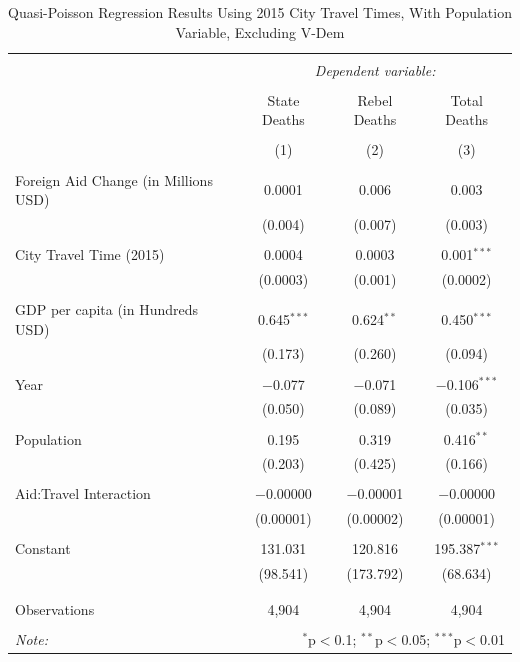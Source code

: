 \documentclass[12pt, letterpaper]{article}
\begin{document}
\begin{table}[!htbp] \centering 
	\caption{Quasi-Poisson Regression Results Using 2015 City Travel Times, With Population Variable, Excluding V-Dem } 
	\label{robustyearly2015pop} 
	\begin{tabular}{@{\extracolsep{5pt}}lccc} 
		\\[-1.8ex]\hline 
		\hline \\[-1.8ex] 
		& \multicolumn{3}{c}{\textit{Dependent variable:}} \\ 
		\cline{2-4} 
		\\[-1.8ex] & State Deaths & Rebel Deaths & Total Deaths \\ 
		\\[-1.8ex] & (1) & (2) & (3)\\ 
		\hline \\[-1.8ex] 
		Foreign Aid Change (in Millions USD) & 0.0001 & 0.006 & 0.003 \\ 
		& (0.004) & (0.007) & (0.003) \\ 
		& & & \\ 
		City Travel Time (2015) & 0.0004 & 0.0003 & 0.001$^{***}$ \\ 
		& (0.0003) & (0.001) & (0.0002) \\ 
		& & & \\ 
		GDP per capita (in Hundreds USD) & 0.645$^{***}$ & 0.624$^{**}$ & 0.450$^{***}$ \\ 
		& (0.173) & (0.260) & (0.094) \\ 
		& & & \\ 
		Year & $-$0.077 & $-$0.071 & $-$0.106$^{***}$ \\ 
		& (0.050) & (0.089) & (0.035) \\ 
		& & & \\ 
		Population & 0.195 & 0.319 & 0.416$^{**}$ \\ 
		& (0.203) & (0.425) & (0.166) \\ 
		& & & \\ 
		Aid:Travel Interaction & $-$0.00000 & $-$0.00001 & $-$0.00000 \\ 
		& (0.00001) & (0.00002) & (0.00001) \\ 
		& & & \\ 
		Constant & 131.031 & 120.816 & 195.387$^{***}$ \\ 
		& (98.541) & (173.792) & (68.634) \\ 
		& & & \\ 
		\hline \\[-1.8ex] 
		Observations & 4,904 & 4,904 & 4,904 \\ 
		\hline 
		\hline \\[-1.8ex] 
		\textit{Note:}  & \multicolumn{3}{r}{$^{*}$p$<$0.1; $^{**}$p$<$0.05; $^{***}$p$<$0.01} \\ 
	\end{tabular} 
\end{table}
\end{document}
